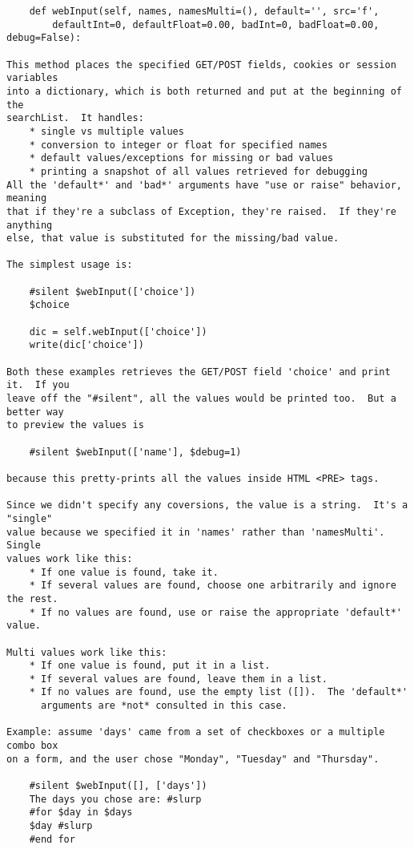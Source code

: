 \begin{verbatim}
    def webInput(self, names, namesMulti=(), default='', src='f',
        defaultInt=0, defaultFloat=0.00, badInt=0, badFloat=0.00, debug=False):

This method places the specified GET/POST fields, cookies or session variables
into a dictionary, which is both returned and put at the beginning of the
searchList.  It handles:
    * single vs multiple values
    * conversion to integer or float for specified names
    * default values/exceptions for missing or bad values
    * printing a snapshot of all values retrieved for debugging
All the 'default*' and 'bad*' arguments have "use or raise" behavior, meaning 
that if they're a subclass of Exception, they're raised.  If they're anything
else, that value is substituted for the missing/bad value.  

The simplest usage is:

    #silent $webInput(['choice'])
    $choice

    dic = self.webInput(['choice'])
    write(dic['choice'])

Both these examples retrieves the GET/POST field 'choice' and print it.  If you
leave off the "#silent", all the values would be printed too.  But a better way
to preview the values is

    #silent $webInput(['name'], $debug=1)

because this pretty-prints all the values inside HTML <PRE> tags.

Since we didn't specify any coversions, the value is a string.  It's a "single"
value because we specified it in 'names' rather than 'namesMulti'.  Single
values work like this:
    * If one value is found, take it.
    * If several values are found, choose one arbitrarily and ignore the rest.
    * If no values are found, use or raise the appropriate 'default*' value.

Multi values work like this:
    * If one value is found, put it in a list.
    * If several values are found, leave them in a list.
    * If no values are found, use the empty list ([]).  The 'default*' 
      arguments are *not* consulted in this case.

Example: assume 'days' came from a set of checkboxes or a multiple combo box
on a form, and the user chose "Monday", "Tuesday" and "Thursday".

    #silent $webInput([], ['days'])
    The days you chose are: #slurp
    #for $day in $days
    $day #slurp
    #end for


\end{verbatim}
